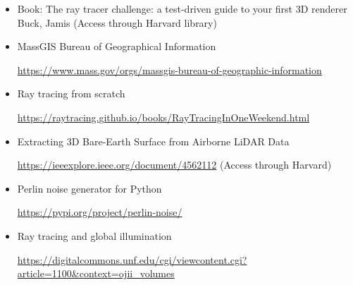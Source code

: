 \documentclass{amsart}
\begin{document}
\begin{itemize}
      \item Book: The ray tracer challenge: a test-driven guide to your first 3D renderer Buck, Jamis (Access through Harvard library)

      \item MassGIS Bureau of Geographical Information

            \url{https://www.mass.gov/orgs/massgis-bureau-of-geographic-information}
      \item Ray tracing from scratch

            \url{https://raytracing.github.io/books/RayTracingInOneWeekend.html}
      \item Extracting 3D Bare-Earth Surface from Airborne LiDAR Data

            \url{https://ieeexplore.ieee.org/document/4562112} (Access through Harvard)
      \item Perlin noise generator for Python

            \url{https://pypi.org/project/perlin-noise/}
      \item Ray tracing and global illumination

            \url{https://digitalcommons.unf.edu/cgi/viewcontent.cgi?article=1100&context=ojii_volumes}

\end{itemize}
\end{document}

